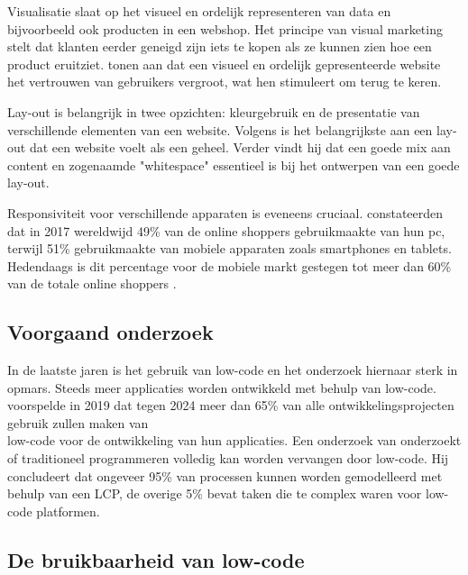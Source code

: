 Visualisatie slaat op het visueel en ordelijk representeren van data en bijvoorbeeld ook producten in een webshop. Het principe van visual marketing stelt dat klanten eerder geneigd zijn iets te kopen als ze kunnen zien hoe een product eruitziet. \textcite{saoula2023building} tonen aan dat een visueel en ordelijk gepresenteerde website het vertrouwen van gebruikers vergroot, wat hen stimuleert om terug te keren.

\vspace{\baselineskip}

Lay-out is belangrijk in twee opzichten: kleurgebruik en de presentatie van verschillende elementen van een website. Volgens \textcite{beaird2020principles} is het belangrijkste aan een lay-out dat een website voelt als een geheel. Verder vindt hij dat een goede mix aan content en zogenaamde "whitespace" essentieel is bij het ontwerpen van een goede lay-out.

\vspace{\baselineskip}

Responsiviteit voor verschillende apparaten is eveneens cruciaal. \textcite{wagner2020online} constateerden dat in 2017 wereldwijd 49\% van de online shoppers gebruikmaakte van hun pc, terwijl 51\% gebruikmaakte van mobiele apparaten zoals smartphones en tablets. Hedendaags is dit percentage voor de mobiele markt gestegen tot meer dan 60\% van de totale online shoppers \autocite{Seitz2024}.

\subsection{Voorgaand onderzoek}
\label{sec:Voorgaand onderzoek}

In de laatste jaren is het gebruik van low-code en het onderzoek hiernaar sterk in opmars. Steeds meer applicaties worden ontwikkeld met behulp van low-code. \textcite{GartnerResearch2019} voorspelde in 2019 dat tegen 2024 meer dan 65\% van alle ontwikkelingsprojecten gebruik zullen maken van \\low-code voor de ontwikkeling van hun applicaties. Een onderzoek van \textcite{VanMullem2022} onderzoekt of traditioneel programmeren volledig kan worden vervangen door low-code. Hij concludeert dat ongeveer 95\% van processen kunnen worden gemodelleerd met behulp van een LCP, de overige 5\% bevat taken die te complex waren voor low-code platformen.

\subsection{De bruikbaarheid van low-code}
\label{sec:De bruikbaarheid van low-code}

